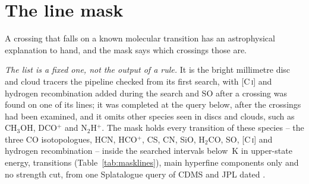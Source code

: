 \section{The line mask}
\label{app:linemask}

A crossing that falls on a known molecular transition has an astrophysical
explanation to hand, and the mask says which crossings those are.

\emph{The list is a fixed one, not the output of a rule.} It is the bright
millimetre disc and cloud tracers the pipeline checked from its first search,
with [C\,\textsc{i}] and hydrogen recombination added during the search and SO
after a crossing was found on one of its lines; it was completed at the query
below, after the crossings had been examined, and it omits other species seen
in discs and clouds, such as CH$_3$OH, DCO$^{+}$ and N$_2$H$^{+}$. The mask
holds every transition of these \FrNSpec{} species -- the three CO isotopologues, HCN, HCO$^{+}$, CS, CN, SiO, H$_2$CO, SO,
[C\,\textsc{i}] and hydrogen recombination -- inside the \McNIsland{}
searched intervals below \McEuMax\,K in upper-state energy, \FrNTrans{}
transitions (Table~\ref{tab:masklines}), main hyperfine components only and no
strength cut, from one Splatalogue query \citep{Splatalogue2007} of CDMS and
JPL \citep{Pickett1998,CDMS2005} dated \MkListDate.


